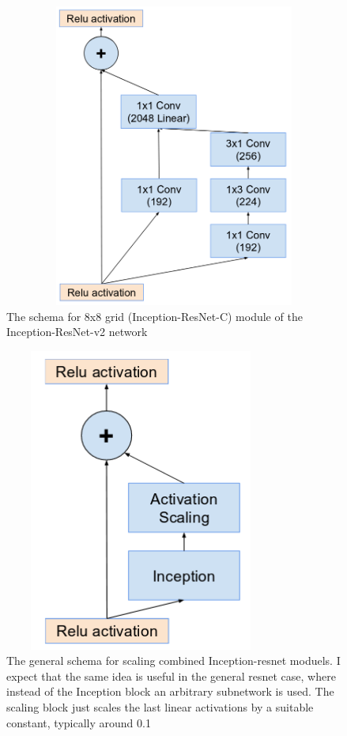 \documentclass[a4paper,12pt, twoside]{NITKReport}
\begin{document}
\begin{figure}[h]
  \centering
    
    \includegraphics[height=10cm,width=13cm]{figure19.png}
    \caption{The schema for 8x8 grid (Inception-ResNet-C) module of the Inception-ResNet-v2 network}
    \label{19}
  
  \end{figure}
\begin{figure}
\centering
    \includegraphics[height=10cm,width=9cm]{figure20.png}
    \caption{The general schema for scaling combined Inception-resnet moduels. I expect that the same idea is useful in the general resnet case, where instead of the Inception block an arbitrary subnetwork is used.  The scaling block just scales the last linear activations by a suitable constant, typically around 0.1}
    \label{20}
\end{figure}
\end{document}
